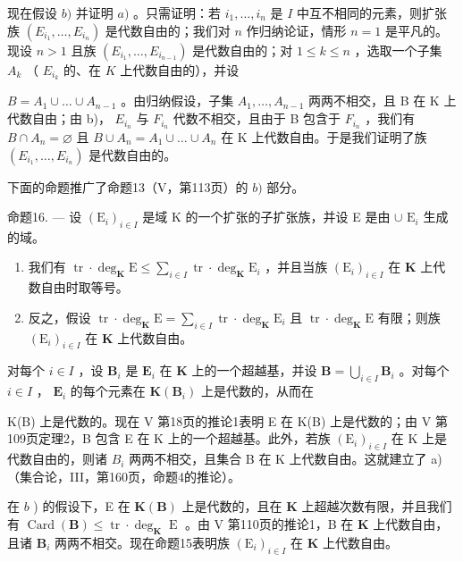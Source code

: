 现在假设 \(b)\) 并证明 \(a)\) 。只需证明：若 \(i_1, \ldots, i_n\) 是 \(I\) 中互不相同的元素，则扩张族 \((E_{i_1}, \ldots, E_{i_n})\) 是代数自由的；我们对 \(n\) 作归纳论证，情形 \(n = 1\) 是平凡的。现设 \(n > 1\) 且族 \((E_{i_1}, \ldots, E_{i_{n-1}})\) 是代数自由的；对 \(1 \leqslant k \leqslant n\) ，选取一个子集 \(A_k\) （ \(E_{i_k}\) 的、在 \(K\) 上代数自由的），并设

\(B = A_{1} \cup \ldots \cup A_{n-1}\) 。由归纳假设，子集 \(A_{1}, \ldots, A_{n-1}\) 两两不相交，且 B 在 K 上代数自由；由 b)， \(E_{i_{n}}\) 与 \(F_{i_{n}}\) 代数不相交，且由于 B 包含于 \(F_{i_{n}}\) ，我们有 \(B \cap A_{n} = \varnothing\) 且 \(B \cup A_{n} = A_{1} \cup \ldots \cup A_{n}\) 在 K 上代数自由。于是我们证明了族 \((E_{i_{1}}, \ldots, E_{i_{n}})\) 是代数自由的。

下面的命题推广了命题13（V，第113页）的 \(b)\) 部分。

命题16. --- 设 \((\mathrm{E}_i)_{i\in I}\) 是域 K 的一个扩张的子扩张族，并设 E 是由 \(\cup\) \(\mathrm{E}_i\) 生成的域。

\begin{enumerate}
\def\labelenumi{\alph{enumi})}
\item
  我们有 \(\operatorname{tr} \cdot \deg_{\mathbf{K}} \mathrm{E} \leqslant \sum_{i \in I} \operatorname{tr} \cdot \deg_{\mathbf{K}} \mathrm{E}_i\) ，并且当族 \((\mathrm{E}_i)_{i \in I}\) 在 \(\mathbf{K}\) 上代数自由时取等号。
\item
  反之，假设 \(\operatorname{tr} \cdot \deg_{\mathbf{K}} \mathrm{E} = \sum_{i \in I} \operatorname{tr} \cdot \deg_{\mathbf{K}} \mathrm{E}_i\) 且 \(\operatorname{tr} \cdot \deg_{\mathbf{K}} \mathrm{E}\) 有限；则族 \((\mathrm{E}_i)_{i \in I}\) 在 \(\mathbf{K}\) 上代数自由。
\end{enumerate}

对每个 \(i \in I\) ，设 \(\mathbf{B}_i\) 是 \(\mathbf{E}_i\) 在 \(\mathbf{K}\) 上的一个超越基，并设 \(\mathbf{B} = \bigcup_{i \in I} \mathbf{B}_i\) 。对每个 \(i \in I\) ， \(\mathbf{E}_i\) 的每个元素在 \(\mathbf{K}(\mathbf{B}_i)\) 上是代数的，从而在

K(B) 上是代数的。现在 V 第18页的推论1表明 E 在 K(B) 上是代数的；由 V 第109页定理2，B 包含 E 在 K 上的一个超越基。此外，若族 \((\mathrm{E}_{i})_{i\in I}\) 在 K 上是代数自由的，则诸 \(B_{i}\) 两两不相交，且集合 B 在 K 上代数自由。这就建立了 a)（集合论，III，第160页，命题4的推论）。

在 \(b\) ) 的假设下，E 在 \(\mathbf{K}(\mathbf{B})\) 上是代数的，且在 \(\mathbf{K}\) 上超越次数有限，并且我们有 \(\operatorname{Card}(\mathbf{B}) \leqslant \operatorname{tr} \cdot \deg_{\mathbf{K}} \operatorname{E}\) 。由 V 第110页的推论1，B 在 \(\mathbf{K}\) 上代数自由，且诸 \(\mathbf{B}_i\) 两两不相交。现在命题15表明族 \((\mathrm{E}_i)_{i \in I}\) 在 \(\mathbf{K}\) 上代数自由。

